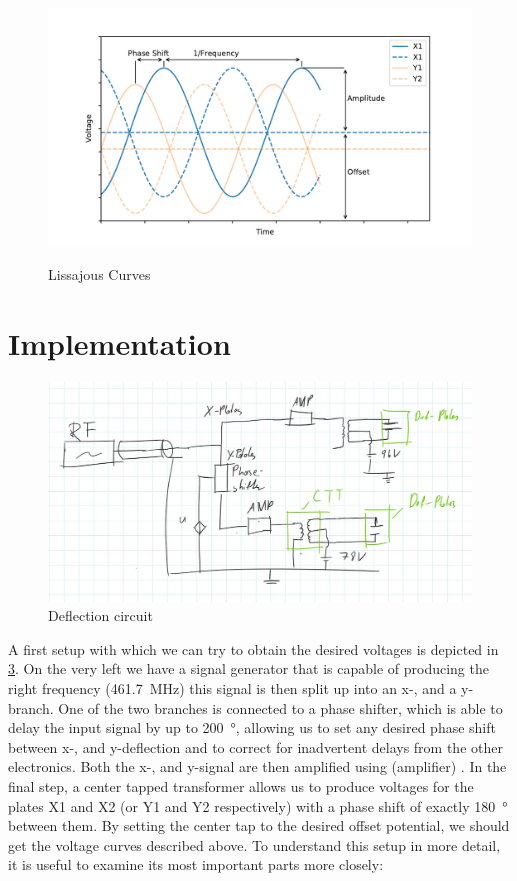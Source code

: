 \begin{figure}
	\centering
	\includegraphics[width=0.7\linewidth]{Chapters/Deflection/VoltageAspects}
	\caption{}
	\label{fig:VoltageAspects}
\end{figure}


\begin{figure}[h]
	\centering
	
	\begin{tikzpicture}
		
	\end{tikzpicture}
	
	\caption{Lissajous Curves}
	\label{fig:Lissajous Curves}
\end{figure}

\section{Implementation}

\begin{figure}
	\centering
	\includegraphics[width=0.7\linewidth]{Chapters/Deflection/deflec_circuit}
	\caption{Deflection circuit}
	\label{fig:deflec_circuit}
\end{figure}

A first setup with which we can try to obtain the desired voltages is depicted in \cref{fig:deflec_circuit}. On the  very left we have a signal generator that is capable of producing the right frequency (\SI{461.7}{\mega\hertz}) this signal is then split up into an x-, and a y-branch. One of the two branches is connected to a phase shifter, which is able to delay the input signal by up to \SI{200}{\degree}, allowing us to set any desired phase shift between x-, and y-deflection and to correct for inadvertent delays from the other electronics. Both the x-, and  y-signal are then amplified using (amplifier) . In the final step, a center tapped transformer allows us to produce voltages for the plates X1 and X2 (or Y1 and Y2 respectively) with a phase shift of exactly \SI{180}{\degree} between them. By setting the center tap to the desired offset potential, we should get the voltage curves described above. To understand this setup in more detail, it is useful to examine its most important parts more closely:

